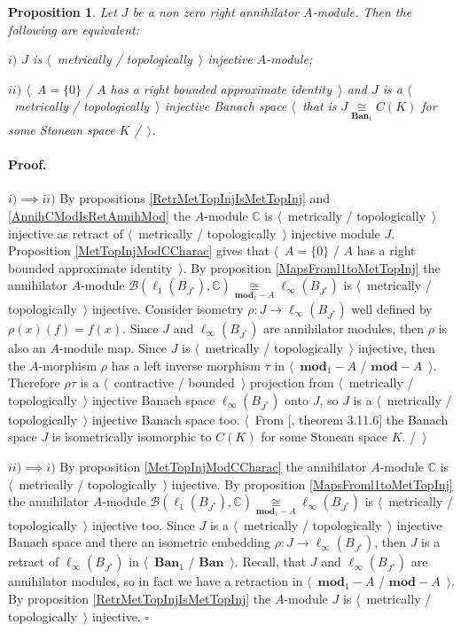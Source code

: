 \documentclass[12pt]{article}
\newcommand{\isom}[1]{\mathop{\mathbin{\cong}}\limits_{#1}}
\newtheorem{proposition}[theorem]{Proposition}
\renewenvironment{proof}{\paragraph{Proof.}}{\hfill$\square$\medskip}
\begin{document}
\begin{proposition}\label{MetTopInjOfAnnihModCharac} Let $J$ be a non zero right annihilator $A$-module. Then the following are equivalent:

$i)$ $J$ is $\langle$~metrically / topologically~$\rangle$ injective $A$-module;

$ii)$ $\langle$~$A=\{0\}$ / $A$ has a right bounded approximate identity~$\rangle$ and $J$ is a $\langle$~metrically / topologically~$\rangle$ injective Banach space $\langle$~that is $J\isom{\mathbf{Ban}_1}C(K)$ for some Stonean space $K$ /~$\rangle$.
\end{proposition}
\begin{proof} $i)$$\implies$$ ii)$  By propositions \ref{RetrMetTopInjIsMetTopInj} and \ref{AnnihCModIsRetAnnihMod} the $A$-module $\mathbb{C}$ is $\langle$~metrically / topologically~$\rangle$ injective as retract of $\langle$~metrically / topologically~$\rangle$ injective module $J$. Proposition \ref{MetTopInjModCCharac} gives that $\langle$~$A=\{0\}$ / $A$ has a right bounded approximate identity~$\rangle$. By proposition \ref{MapsFroml1toMetTopInj} the annihilator $A$-module $\mathcal{B}(\ell_1(B_{J^*}),\mathbb{C})\isom{\mathbf{mod}_1-A}\ell_\infty(B_{J^*})$ is $\langle$~metrically / topologically~$\rangle$ injective. Consider isometry $\rho:J\to\ell_\infty(B_{J^*})$ well defined by $\rho(x)(f)=f(x)$. Since $J$ and $\ell_\infty(B_{J^*})$ are annihilator modules, then $\rho$ is also an $A$-module map. Since $J$ is $\langle$~metrically / topologically~$\rangle$ injective, then the $A$-morphism $\rho$ has a left inverse morphism $\tau$ in $\langle$~$\mathbf{mod}_1-A$ / $\mathbf{mod}-A$~$\rangle$. Therefore $\rho\tau$ is a $\langle$~contractive / bounded~$\rangle$ projection from $\langle$~metrically / topologically~$\rangle$ injective Banach space $\ell_\infty(B_{J^*})$ onto $J$, so $J$ is a $\langle$~metrically / topologically~$\rangle$ injective Banach space too. $\langle$~From  [\cite{LaceyIsomThOfClassicBanSp}, theorem 3.11.6] the Banach space $J$ is isometrically isomorphic to $C(K)$ for some Stonean space $K$. /~$\rangle$ 

$ii)$$\implies$$ i)$ By proposition \ref{MetTopInjModCCharac} the annihilator $A$-module $\mathbb{C}$ is $\langle$~metrically / topologically~$\rangle$ injective. By proposition \ref{MapsFroml1toMetTopInj} the annihilator $A$-module $\mathcal{B}(\ell_1(B_{J^*}),\mathbb{C})\isom{\mathbf{mod}_1-A}\ell_\infty(B_{J^*})$ is $\langle$~metrically / topologically~$\rangle$ injective too. Since $J$ is a $\langle$~metrically / topologically~$\rangle$ injective Banach space and there an isometric embedding $\rho:J\to \ell_\infty(B_{J^*})$, then $J$ is a retract of $\ell_\infty(B_{J^*})$ in $\langle$~$\mathbf{Ban}_1$ / $\mathbf{Ban}$~$\rangle$. Recall, that $J$ and $\ell_\infty(B_{J^*})$ are annihilator modules, so in fact we have a retraction in $\langle$~$\mathbf{mod}_1-A$ / $\mathbf{mod}-A$~$\rangle$. By proposition \ref{RetrMetTopInjIsMetTopInj} the $A$-module $J$ is $\langle$~metrically / topologically~$\rangle$ injective.
\end{proof}
\end{document}
